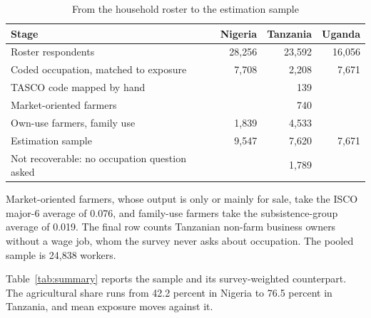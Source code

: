 \begin{table}[ht]
\centering
\caption{From the household roster to the estimation sample}
\label{tab:flow}
\small
\begin{tabular}{lrrr}
\toprule
Stage & Nigeria & Tanzania & Uganda \\
\midrule
Roster respondents                                   & 28{,}256 & 23{,}592 & 16{,}056 \\
Coded occupation, matched to exposure                & 7{,}708  & 2{,}208  & 7{,}671 \\
TASCO code mapped by hand                            &          & 139      &  \\
Market-oriented farmers                              &          & 740      &  \\
Own-use farmers, family use                          & 1{,}839  & 4{,}533  &  \\
\midrule
Estimation sample                                    & 9{,}547  & 7{,}620  & 7{,}671 \\
\midrule
Not recoverable: no occupation question asked        &          & 1{,}789  &  \\
\bottomrule
\end{tabular}

\vspace{4pt}
\begin{minipage}{0.92\linewidth}
\footnotesize
Market-oriented farmers, whose output is only or mainly for sale, take the
ISCO major-6 average of 0.076,
and family-use farmers take the subsistence-group average of 0.019. The final row
counts Tanzanian non-farm business owners without a wage job, whom the survey
never asks about occupation. The pooled sample is 24,838 workers.
\end{minipage}
\end{table}

Table~\ref{tab:summary} reports the sample and its survey-weighted counterpart.
The agricultural share runs from 42.2 percent in Nigeria to 76.5 percent in
Tanzania, and mean exposure moves against it.

